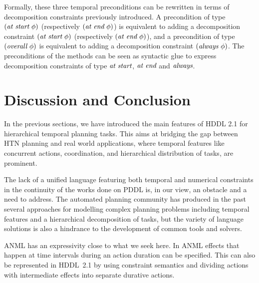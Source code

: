 \documentclass[letterpaper]{article} %
\newcommand{\atstart}{\text{\it at start}}
\newcommand{\atend}{\text{\it at end}}
\newcommand{\always}{\text{\it always}}
\newcommand{\overall}{\text{\it overall}}
\begin{document}
Formally, these three temporal preconditions can be rewritten in terms of decomposition constraints previously introduced. A precondition of type $(\atstart \ \phi)$ (respectively $(\atend \ \phi)$) is equivalent to adding a decomposition constraint $(\atstart \ \phi)$ (respectively $(\atend \ \phi)$), and a precondition of type $(\overall \ \phi)$ is equivalent to adding a decomposition constraint $(\always \ \phi)$. The preconditions of the methods can be seen as syntactic glue to express decomposition constraints of type $\atstart$, $\atend$ and $\always$.

\section{Discussion and Conclusion}
\label{sec:conclusion}


In the previous sections, we have introduced the main features of HDDL 2.1 for hierarchical temporal planning tasks.
This aims at bridging the gap between HTN planning and real world applications, where temporal features like concurrent actions, coordination, and hierarchical distribution of tasks, are prominent.

The lack of a unified language featuring both temporal and numerical constraints in the continuity of the works done on PDDL is, in our view, an obstacle and a need to address. The automated planning community has produced in the past several approaches for modelling complex planning problems including temporal features and a hierarchical decomposition of tasks, but the variety of language solutions is also a hindrance to the development of common tools and solvers.

ANML  \citep{smith08} has an expressivity close to what we seek here.
In ANML effects that happen at time intervals during an action duration can be specified. This  can also be represented in HDDL~2.1 by using constraint semantics and dividing actions with intermediate effects into separate durative actions.
\end{document}
